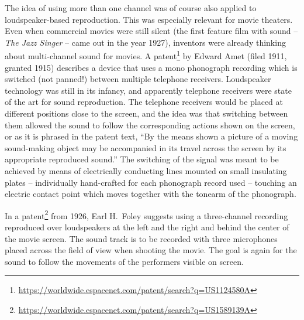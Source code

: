 The idea of using more than one channel was of course also applied to
loudspeaker-based reproduction.
This was especially relevant for movie theaters.
Even when commercial movies were still silent
(the first feature film with sound
-- \emph{The Jazz Singer} --
came out in the year 1927),
inventors were already thinking about multi-channel sound for movies.
A
patent\footnote{\url{https://worldwide.espacenet.com/patent/search?q=US1124580A}}
by Edward Amet (filed 1911, granted 1915)
describes a device that uses a mono phonograph recording
which is switched (not panned!) between multiple telephone receivers.
Loudspeaker technology was still in its infancy,
and apparently telephone receivers were state of the art
for sound reproduction.
The telephone receivers would be placed at different positions
close to the screen,
and the idea was that switching between them allowed the sound
to follow the corresponding actions shown on the screen,
or as it is phrased in the patent text,
``By the means shown a picture of a moving sound-making object
may be accompanied in its travel across the screen by its
appropriate reproduced sound.''
The switching of the signal was meant to be achieved by means of
electrically conducting lines mounted on small insulating plates
-- individually hand-crafted for each phonograph record used --
touching an electric contact point
which moves together with the tonearm of the phonograph.

In a
patent\footnote{\url{https://worldwide.espacenet.com/patent/search?q=US1589139A}}
from 1926,
Earl H.\ Foley
suggests using
a three-channel recording
reproduced over loudspeakers at the left and the right and behind the
center of the movie screen.
The sound track is to be recorded with three microphones
placed across the field of view when shooting the movie.
The goal is again for the sound to follow the movements
of the performers visible on screen.

